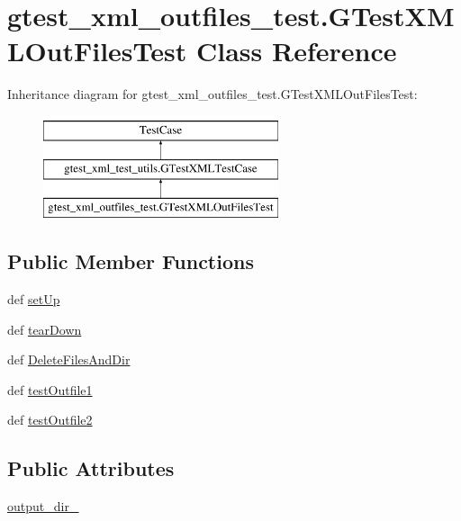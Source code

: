 \hypertarget{classgtest__xml__outfiles__test_1_1_g_test_x_m_l_out_files_test}{\section{gtest\-\_\-xml\-\_\-outfiles\-\_\-test.\-G\-Test\-X\-M\-L\-Out\-Files\-Test Class Reference}
\label{classgtest__xml__outfiles__test_1_1_g_test_x_m_l_out_files_test}
}
Inheritance diagram for gtest\-\_\-xml\-\_\-outfiles\-\_\-test.\-G\-Test\-X\-M\-L\-Out\-Files\-Test\-:\begin{figure}[H]
\begin{center}
\leavevmode
\includegraphics[height=3.000000cm]{classgtest__xml__outfiles__test_1_1_g_test_x_m_l_out_files_test}
\end{center}
\end{figure}
\subsection*{Public Member Functions}
\begin{DoxyCompactItemize}
\item 
def \hyperlink{classgtest__xml__outfiles__test_1_1_g_test_x_m_l_out_files_test_a25292ce520651d1cb15f84f3759f8b9b}{set\-Up}
\item 
def \hyperlink{classgtest__xml__outfiles__test_1_1_g_test_x_m_l_out_files_test_ae128673486bd5fc4f499128acc95cc2e}{tear\-Down}
\item 
def \hyperlink{classgtest__xml__outfiles__test_1_1_g_test_x_m_l_out_files_test_a940400d8fc0b7fc12a2bea61c2b20929}{Delete\-Files\-And\-Dir}
\item 
def \hyperlink{classgtest__xml__outfiles__test_1_1_g_test_x_m_l_out_files_test_a500a1494088efbdf98e1ca2e0cec8103}{test\-Outfile1}
\item 
def \hyperlink{classgtest__xml__outfiles__test_1_1_g_test_x_m_l_out_files_test_ae4604e164f86c7ae156c10155229f0c5}{test\-Outfile2}
\end{DoxyCompactItemize}
\subsection*{Public Attributes}
\begin{DoxyCompactItemize}
\item 
\hyperlink{classgtest__xml__outfiles__test_1_1_g_test_x_m_l_out_files_test_aa5c31cd97047bc1d3060f4d27bc956a4}{output\-\_\-dir\-\_\-}
\end{DoxyCompactItemize}
